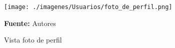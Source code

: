 \begin{figure}[!htb]
  \begin{center}
\texttt{[image: ./imagenes/Usuarios/foto\_de\_perfil.png]}
    \caption{Vista foto de perfil}
    \label{fig:Vista_foto_de_perfil}
    \textbf{Fuente:}  Autores
  \end{center}
\end{figure}
